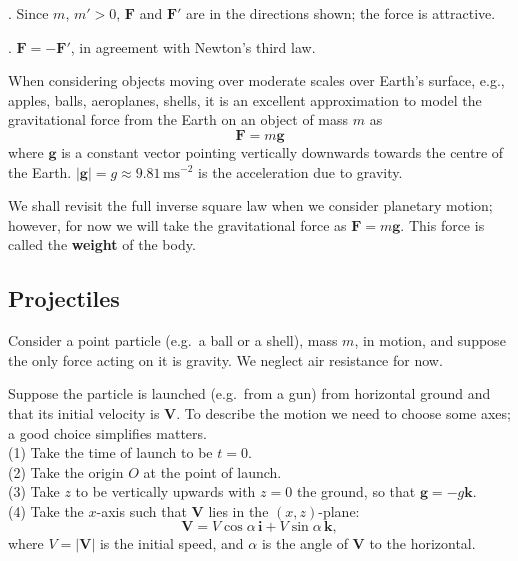 . Since $m$, $m' > 0$, $\boldsymbol{F}$ and $\boldsymbol{F}'$ are in the directions shown;
the force is attractive.
\vspace{1mm}

. $\boldsymbol{F} = - \boldsymbol{F}'$, in agreement with Newton's third law.
\vspace{2mm}


When considering objects moving over moderate scales over Earth's surface, e.g.,
apples, balls, aeroplanes, shells, it is an excellent approximation to model the
gravitational force from the Earth on an object of mass $m$ as
\begin{displaymath}
\boldsymbol{F} = m \boldsymbol{g}
\end{displaymath}
where $\boldsymbol{g}$ is a constant vector pointing vertically downwards towards the
centre of the Earth. $|\boldsymbol{g}| = g \approx 9.81 \, \mathrm{ms}^{-2}$ is the
acceleration due to gravity.

We shall revisit the full inverse square law when we consider planetary motion;
however, for now we will take the gravitational force as $\boldsymbol{F} = m \boldsymbol{g}$.
This force is called the {\bf weight} of the body.


\subsection{Projectiles}
\label{sec:projectiles}

Consider a point particle (e.g.\ a ball or a shell), mass $m$, in motion, and suppose
the only force acting on it is gravity. We neglect air resistance for now.

Suppose the particle is launched (e.g.\ from a gun) from horizontal ground and
that its initial velocity is $\boldsymbol{V}$. To describe the motion we need to choose
some axes; a good choice simplifies matters.\\
(1) Take the time of launch to be $t=0$.\\
(2) Take the origin $O$ at the point of launch.\\
(3) Take $z$ to be vertically upwards with $z=0$ the ground, so that $\boldsymbol{g} = - g \boldsymbol{k}$.\\
(4) Take the $x$-axis such that $\boldsymbol{V}$ lies in the $(x,z)$-plane:
\begin{displaymath}
\boldsymbol{V} = V \cos \alpha \, \boldsymbol{i} + V \sin \alpha \, \boldsymbol{k} ,
\end{displaymath}
where $V = |\boldsymbol{V}|$ is the initial speed, and $\alpha$ is the angle of $\boldsymbol{V}$
to the horizontal.

